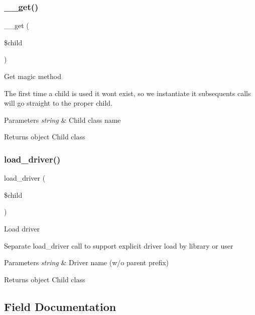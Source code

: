 \subsubsection{\texorpdfstring{\+\_\+\+\_\+get()}{\_\_get()}}
{\footnotesize\ttfamily \+\_\+\+\_\+get (\begin{DoxyParamCaption}\item[{}]{\$child }\end{DoxyParamCaption})}

Get magic method

The first time a child is used it won\textquotesingle{}t exist, so we instantiate it subsequents calls will go straight to the proper child.


\begin{DoxyParams}{Parameters}
{\em string} & Child class name \\
\hline
\end{DoxyParams}
\begin{DoxyReturn}{Returns}
object Child class 
\end{DoxyReturn}
\mbox{\label{class_c_i___driver___library_a7cc2908487e106164664ef7d743690b8}} 
\subsubsection{\texorpdfstring{load\+\_\+driver()}{load\_driver()}}
{\footnotesize\ttfamily load\+\_\+driver (\begin{DoxyParamCaption}\item[{}]{\$child }\end{DoxyParamCaption})}

Load driver

Separate load\+\_\+driver call to support explicit driver load by library or user


\begin{DoxyParams}{Parameters}
{\em string} & Driver name (w/o parent prefix) \\
\hline
\end{DoxyParams}
\begin{DoxyReturn}{Returns}
object Child class 
\end{DoxyReturn}


\subsection{Field Documentation}
\mbox{\label{class_c_i___driver___library_ab820c27413d5904686c58f6b2941b603}} 
